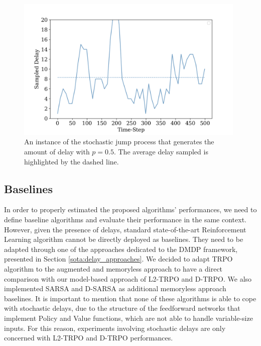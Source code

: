 \begin{figure}[hbtp]
                    \centering
                    \includegraphics[width=11cm]{images/results/delayp05_sampledelay_1.png}
                    \caption{An instance of the stochastic jump process that generates the amount of delay with $p = 0.5$. The average delay sampled is highlighted by the dashed line.}
                    \label{fig:delayp05_sampledelay}
                    
                \end{figure}
                
        \subsection{Baselines}
        \label{sub:baselines}
            In order to properly estimated the proposed algorithms' performances, we need to define baseline algorithms and evaluate their performance in the same context. However, given the presence of delays, standard state-of-the-art Reinforcement Learning algorithm cannot be directly deployed as baselines. They need to be adapted through one of the approaches dedicated to the DMDP framework, presented in Section \ref{sota:delay_approaches}. We decided to adapt TRPO algorithm to the augmented and memoryless approach to have a direct comparison with our model-based approach of L2-TRPO and D-TRPO. We also implemented SARSA and D-SARSA as additional memoryless approach baselines. \newline
            It is important to mention that none of these algorithms is able to cope with stochastic delays, due to the structure of the feedforward networks that implement Policy and Value functions, which are not able to handle variable-size inputs. For this reason, experiments involving stochastic delays are only concerned with L2-TRPO and D-TRPO performances.
            
